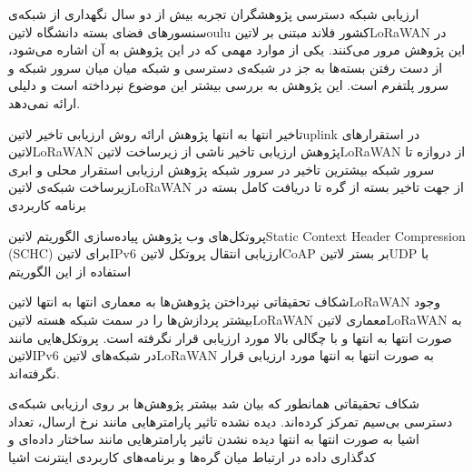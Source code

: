 \documentclass[dvipsnames]{beamer}
\begin{document}
\begin{persian}
	\begin{frame}{ارزیابی شبکه دسترسی}
	   پژوهشگران  تجربه بیش از دو سال نگهداری از شبکه‌ی سنسورهای فضای بسته دانشگاه ‌لاتین{oulu} کشور فلاند مبتنی بر ‌لاتین{LoRaWAN} در این پژوهش مرور می‌کنند.
	   یکی از موارد مهمی که در این پژوهش به آن اشاره می‌شود، از دست رفتن بسته‌ها به جز در شبکه‌ی دسترسی و
	  شبکه میان میان سرور شبکه و سرور پلتفرم است.
	   این پژوهش به بررسی بیشتر این موضوع نپرداخته است و دلیلی ارائه نمی‌دهد.
	\end{frame}

	\begin{frame}{تاخیر انتها به انتها}
	   پژوهش 
	   ارائه روش ارزیابی تاخیر ‌لاتین{uplink} در استقرارهای ‌لاتین{LoRaWAN}
	   پژوهش 
	   ارزیابی تاخیر ناشی از زیرساخت ‌لاتین{LoRaWAN} از دروازه تا سرور شبکه
	   بیشترین تاخیر در سرور شبکه
	   پژوهش 
	   ارزیابی استقرار محلی و ابری زیرساخت شبکه‌ی ‌لاتین{LoRaWAN} از جهت تاخیر بسته از گره تا دریافت کامل بسته در برنامه کاربردی
	\end{frame}

	\begin{frame}{پروتکل‌های وب}
	   پژوهش 
	   پیاده‌سازی الگوریتم ‌لاتین{Static Context Header Compression (SCHC)} برای ‌لاتین{IPv6}
	   ارزیابی انتقال پروتکل ‌لاتین{CoAP} بر بستر ‌لاتین{UDP} با استفاده از این الگوریتم
	\end{frame}

	\begin{frame}{شکاف تحقیقاتی}
	   نپرداختن پژوهش‌ها به معماری انتها به انتها ‌لاتین{LoRaWAN}
	   وجود بیشتر پردازش‌ها را در سمت شبکه هسته ‌لاتین{LoRaWAN}
	   معماری ‌لاتین{LoRaWAN} به صورت انتها به انتها و با چگالی بالا مورد ارزیابی قرار نگرفته است.
	   پروتکل‌هایی مانند ‌لاتین{IPv6} در شبکه‌های ‌لاتین{LoRaWAN} به صورت انتها به انتها مورد ارزیابی قرار نگرفته‌اند.
	\end{frame}

	\begin{frame}{شکاف تحقیقاتی}
		 همانطور که بیان شد بیشتر پژوهش‌ها بر روی ارزیابی شبکه‌ی دسترسی بی‌سیم تمرکز کرده‌اند.
		 دیده نشده تاثیر پارامترهایی مانند نرخ ارسال، تعداد اشیا به صورت انتها به انتها
		 دیده نشدن تاثیر پارامترهایی مانند ساختار داده‌ای و کدگذاری داده در ارتباط میان گره‌ها و برنامه‌های کاربردی اینترنت اشیا
	\end{frame}


\end{persian}
\end{document}
